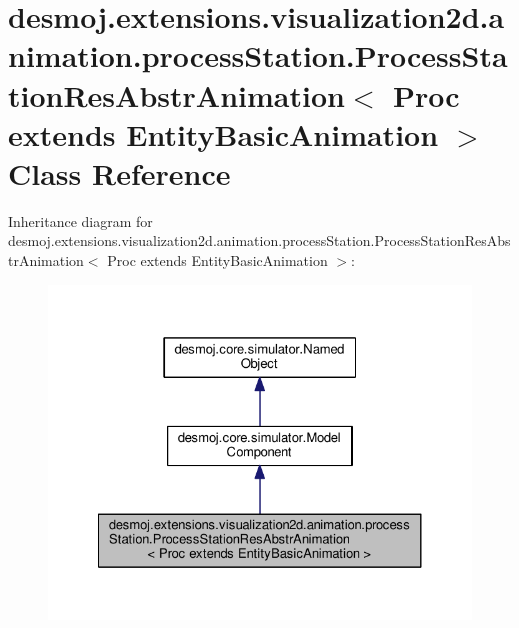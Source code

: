 \section{desmoj.\-extensions.\-visualization2d.\-animation.\-process\-Station.\-Process\-Station\-Res\-Abstr\-Animation$<$ Proc extends Entity\-Basic\-Animation $>$ Class Reference}
\label{classdesmoj_1_1extensions_1_1visualization2d_1_1animation_1_1process_station_1_1_process_station474de8219a5f754f448a4c3f0afce2bd}


Inheritance diagram for desmoj.\-extensions.\-visualization2d.\-animation.\-process\-Station.\-Process\-Station\-Res\-Abstr\-Animation$<$ Proc extends Entity\-Basic\-Animation $>$\-:
\nopagebreak
\begin{figure}[H]
\begin{center}
\leavevmode
\includegraphics[width=326pt]{classdesmoj_1_1extensions_1_1visualization2d_1_1animation_1_1process_station_1_1_process_station92e167f2888bf6cafa45c96784ae7001}
\end{center}
\end{figure}


